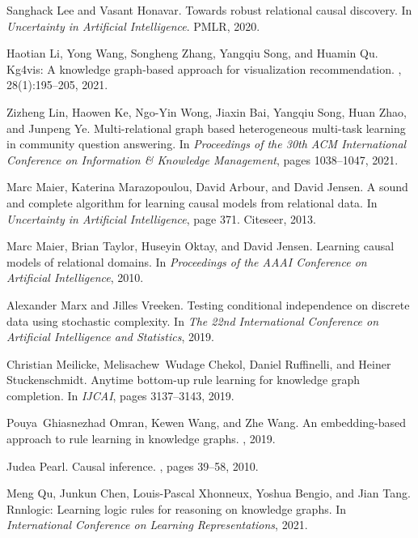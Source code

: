 \documentclass[11pt]{article}
\begin{document}
\begin{thebibliography}{10}
Sanghack Lee and Vasant Honavar.
\newblock Towards robust relational causal discovery.
\newblock In {\em Uncertainty in Artificial Intelligence}. PMLR, 2020.

Haotian Li, Yong Wang, Songheng Zhang, Yangqiu Song, and Huamin Qu.
\newblock Kg4vis: A knowledge graph-based approach for visualization
  recommendation.
,
  28(1):195--205, 2021.

Zizheng Lin, Haowen Ke, Ngo-Yin Wong, Jiaxin Bai, Yangqiu Song, Huan Zhao, and
  Junpeng Ye.
\newblock Multi-relational graph based heterogeneous multi-task learning in
  community question answering.
\newblock In {\em Proceedings of the 30th ACM International Conference on
  Information \& Knowledge Management}, pages 1038--1047, 2021.

Marc Maier, Katerina Marazopoulou, David Arbour, and David Jensen.
\newblock A sound and complete algorithm for learning causal models from
  relational data.
\newblock In {\em Uncertainty in Artificial Intelligence}, page 371. Citeseer,
  2013.

Marc Maier, Brian Taylor, Huseyin Oktay, and David Jensen.
\newblock Learning causal models of relational domains.
\newblock In {\em Proceedings of the AAAI Conference on Artificial
  Intelligence}, 2010.

Alexander Marx and Jilles Vreeken.
\newblock Testing conditional independence on discrete data using stochastic
  complexity.
\newblock In {\em The 22nd International Conference on Artificial Intelligence
  and Statistics}, 2019.

Christian Meilicke, Melisachew~Wudage Chekol, Daniel Ruffinelli, and Heiner
  Stuckenschmidt.
\newblock Anytime bottom-up rule learning for knowledge graph completion.
\newblock In {\em IJCAI}, pages 3137--3143, 2019.

Pouya~Ghiasnezhad Omran, Kewen Wang, and Zhe Wang.
\newblock An embedding-based approach to rule learning in knowledge graphs.
, 2019.

Judea Pearl.
\newblock Causal inference.
, pages 39--58, 2010.

Meng Qu, Junkun Chen, Louis-Pascal Xhonneux, Yoshua Bengio, and Jian Tang.
\newblock Rnnlogic: Learning logic rules for reasoning on knowledge graphs.
\newblock In {\em International Conference on Learning Representations}, 2021.


\end{thebibliography}
\end{document}

